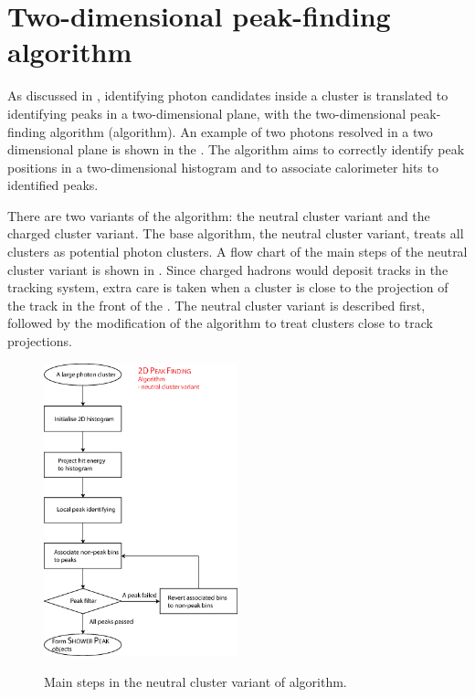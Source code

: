 \section{Two-dimensional peak-finding algorithm}
\label{sec:peakFinding}

As discussed in , identifying photon candidates inside a cluster is translated to identifying peaks in a two-dimensional plane, with the two-dimensional peak-finding algorithm (\peakFinding algorithm). An example of two photons resolved in a two dimensional plane is shown in the . The \peakFinding algorithm aims to correctly identify peak positions in a two-dimensional histogram and to associate calorimeter hits to identified peaks.

There are two variants of the \peakFinding algorithm: the neutral cluster variant and the charged cluster variant. The base algorithm, the neutral cluster variant, treats all clusters as potential photon clusters. A flow chart of the main steps of the  neutral cluster variant is shown in . Since charged hadrons would deposit tracks in the tracking system, extra care is taken when a cluster is close to the projection of the track in the front of the \ECAL. The neutral cluster variant is described first, followed by the modification of the algorithm to treat clusters close to track projections.

\begin{figure}[tbph]
\centering
{\includegraphics[width=0.5\textwidth]{photon/2DpeakFinding}}
\caption[Flow chart for \peakFinding algorithm neutral cluster variant.]
{Main steps in the  neutral cluster variant of \peakFinding algorithm.}
\label{fig:photonPeakFindingFlowNeutral}
\end{figure}

